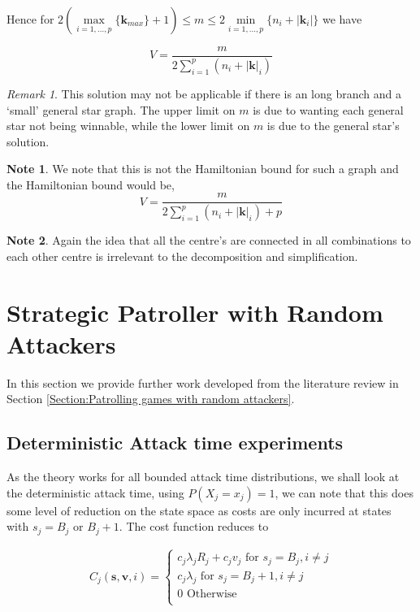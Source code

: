 \documentclass[a4paper,10pt]{article}
\theoremstyle{definition}
\theoremstyle{definition}
\theoremstyle{remark}
\newtheorem*{remark}{Remark}
\theoremstyle{definition}
\newtheorem*{note}{Note}
\begin{document}
Hence for $2(\max\limits_{i=1,...,p} \{\bm{k}_{max} \} +1 ) \leq m \leq 2 \min\limits_{i=1,...,p} \{ n_{i}+|\bm{k}_{i}| \} $ we have

$$V=\frac{m}{2 \sum\limits_{i=1}^{p} (n_{i} + |\bm{k}|_{i})}$$

\begin{remark}
This solution may not be applicable if there is an long branch and a `small' general star graph. The upper limit on $m$ is due to wanting each general star not being winnable, while the lower limit on $m$ is due to the general star's solution.
\end{remark}

\begin{note}
We note that this is not the Hamiltonian bound for such a graph and the Hamiltonian bound would be,
$$V=\frac{m}{2 \sum\limits_{i=1}^{p} (n_{i} + |\bm{k}|_{i}) + p}$$
\end{note}

\begin{note}
Again the idea that all the centre's are connected in all combinations to each other centre is irrelevant to the decomposition and simplification.
\end{note}




\section{Strategic Patroller with Random Attackers}
In this section we provide further work developed from the literature review in Section \ref{Section:Patrolling games with random attackers}.

\subsection{Deterministic Attack time experiments}
As the theory  works for all bounded attack time distributions, we shall look at the deterministic attack time, using $P(X_{j}=x_{j})=1$, we can note that this does some level of reduction on the state space as costs are only incurred at states with $s_{j}=B_{j}$ or $B_{j}+1$. The cost function reduces to

\begin{align*}
C_{j}(\bm{s},\bm{v},i)=\begin{cases}
c_{j} \lambda_{j} R_{j} + c_{j} v_{j}  \text{ for } s_{j}=B_{j},i \neq j \\ 
c_{j} \lambda_{j} \text{ for } s_{j}=B_{j}+1,i \neq j  \\
0 \text{ Otherwise} \\
\end{cases}
\end{align*}
\end{document}
